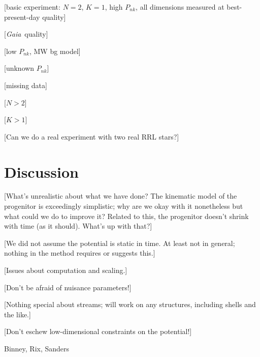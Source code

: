 \documentclass[letterpaper,12pt,preprint]{aastex}
\newcommand{\project}[1]{\textsl{#1}}
\newcommand{\gaia}{\project{Gaia}}
\begin{document}
[basic experiment: $N=2$, $K=1$, high $P_{nk}$, all dimensions
  measured at best-present-day quality]

[\gaia\ quality]

[low $P_{nk}$, MW bg model]

[unknown $P_{nk}$]

[missing data]

[$N>2$]

[$K>1$]

[Can we do a real experiment with two real RRL stars?]

\section{Discussion}

[What's unrealistic about what we have done?  The kinematic model of
  the progenitor is exceedingly simplistic; why are we okay with it
  nonetheless but what could we do to improve it?  Related to this,
  the progenitor doesn't shrink with time (as it should).  What's up
  with that?]

[We did not assume the potential is static in time.  At least not in
  general; nothing in the method requires or suggests this.]

[Issues about computation and scaling.]

[Don't be afraid of nuisance parameters!]

[Nothing special about streams; will work on any structures, including
  shells and the like.]

[Don't eschew low-dimensional constraints on the potential!]

\acknowledgements
Binney, Rix, Sanders
\end{document}
